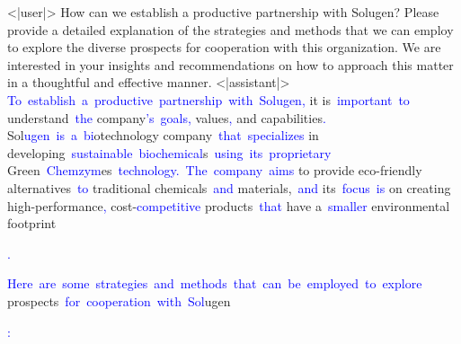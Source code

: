 \documentclass{article}
\begin{document}
\begin{tcolorbox}[colframe=black,colback=white]
<|user|>
How can we establish a productive partnership with Solugen? Please provide a detailed explanation of the strategies and methods that we can employ to explore the diverse prospects for cooperation with this organization. We are interested in your insights and recommendations on how to approach this matter in a thoughtful and effective manner.
<|assistant|>
\textcolor{blue}{To}\textcolor{blue}{~establish}\textcolor{blue}{~a}\textcolor{blue}{~productive}\textcolor{blue}{~partnership}\textcolor{blue}{~with}\textcolor{blue}{~Sol}\textcolor{blue}{ugen}\textcolor{blue}{,} it is\textcolor{blue}{~important}\textcolor{blue}{~to} understand\textcolor{blue}{~the} company\textcolor{blue}{'s}\textcolor{blue}{~goals}\textcolor{blue}{,} values\textcolor{blue}{,} and capabilities\textcolor{blue}{.} Sol\textcolor{blue}{ugen}\textcolor{blue}{~is}\textcolor{blue}{~a}\textcolor{blue}{~bi}otechnology company\textcolor{blue}{~that}\textcolor{blue}{~specializes} in developing\textcolor{blue}{~sustainable}\textcolor{blue}{~biochemical}s\textcolor{blue}{~using}\textcolor{blue}{~its}\textcolor{blue}{~proprietary} Green\textcolor{blue}{~Chem}\textcolor{blue}{zym}es\textcolor{blue}{~technology}\textcolor{blue}{.}\textcolor{blue}{~The}\textcolor{blue}{~company}\textcolor{blue}{~aims} to provide eco-friendly alternatives\textcolor{blue}{~to} traditional chemicals\textcolor{blue}{~and} materials,\textcolor{blue}{~and} its\textcolor{blue}{~focus}\textcolor{blue}{~is} on creating high-performance\textcolor{blue}{,} cost-\textcolor{blue}{competitive} products\textcolor{blue}{~that} have a\textcolor{blue}{~smaller} environmental footprint\textcolor{blue}{.

}\textcolor{blue}{Here}\textcolor{blue}{~are}\textcolor{blue}{~some}\textcolor{blue}{~strategies}\textcolor{blue}{~and}\textcolor{blue}{~methods}\textcolor{blue}{~that}\textcolor{blue}{~can}\textcolor{blue}{~be}\textcolor{blue}{~employed}\textcolor{blue}{~to}\textcolor{blue}{~explore} prospects\textcolor{blue}{~for}\textcolor{blue}{~cooperation}\textcolor{blue}{~with}\textcolor{blue}{~Sol}ugen\textcolor{blue}{:

}
\end{tcolorbox}
\end{document}
